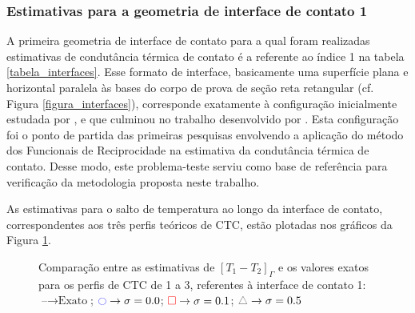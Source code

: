 \subsubsection{Estimativas para a geometria de interface de contato 1}

A primeira geometria de interface de contato para a qual foram realizadas estimativas de condutância térmica de contato é a referente ao índice 1 na tabela \ref{tabela_interfaces}. Esse formato de interface, basicamente uma superfície plana e horizontal paralela às bases do corpo de prova de seção reta retangular (cf. Figura \ref{figura_interfaces}), corresponde exatamente à configuração inicialmente estudada por \cite{reciproc_3}, e que culminou no trabalho desenvolvido por \cite{tese_padilha}. Esta configuração foi o ponto de partida das primeiras pesquisas envolvendo a aplicação do método dos Funcionais de Reciprocidade na estimativa da condutância térmica de contato. Desse modo, este problema-teste serviu como base de referência para verificação da metodologia proposta neste trabalho.

As estimativas para o salto de temperatura ao longo da interface de contato, correspondentes aos três perfis teóricos de CTC, estão plotadas nos gráficos da Figura \ref{figura_delta_temperaturas_interface_01}. 
\begin{figure}[H]
	\caption{Comparação entre as estimativas de $[T_1 - T_2]_\Gamma$ e os valores exatos para os perfis de CTC de 1 a 3, referentes à interface de contato 1: $\text{--} \rightarrow \text{Exato}$; $\textcolor{blue}{\ocircle} \rightarrow \sigma = 0.0$; $\textcolor{red}{\square} \rightarrow \sigma = 0.1$; $\textcolor{gray}{\triangle} \rightarrow \sigma = 0.5$}
	\label{figura_delta_temperaturas_interface_01}
\end{figure}

